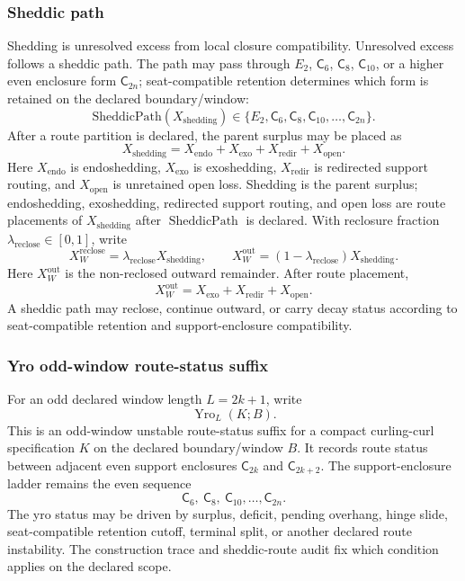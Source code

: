 \subsubsection{Sheddic path}
\label{subsec:sheddic-path}
Shedding is unresolved excess from local closure compatibility. Unresolved excess follows a sheddic path. The path may pass through \(E_2\), \(\mathsf C_6\), \(\mathsf C_8\), \(\mathsf C_{10}\), or a higher even enclosure form \(\mathsf C_{2n}\); seat-compatible retention determines which form is retained on the declared boundary/window:
\begin{equation}
\mathrm{SheddicPath}(X_{\mathrm{shedding}})
\in
\{E_2,\mathsf C_6,\mathsf C_8,\mathsf C_{10},\ldots,\mathsf C_{2n}\}.
\label{eq:sheddic-path}
\end{equation}
After a route partition is declared, the parent surplus may be placed as
\begin{equation}
X_{\mathrm{shedding}}
=
X_{\mathrm{endo}}+X_{\mathrm{exo}}+X_{\mathrm{redir}}+X_{\mathrm{open}}.
\label{eq:shedding-route-partition}
\end{equation}
Here \(X_{\mathrm{endo}}\) is endoshedding, \(X_{\mathrm{exo}}\) is exoshedding, \(X_{\mathrm{redir}}\) is redirected support routing, and \(X_{\mathrm{open}}\) is unretained open loss. Shedding is the parent surplus; endoshedding, exoshedding, redirected support routing, and open loss are route placements of \(X_{\mathrm{shedding}}\) after \(\operatorname{SheddicPath}\) is declared.
With reclosure fraction \(\lambda_{\mathrm{reclose}}\in[0,1]\), write
\[
X_W^{\mathrm{reclose}}=\lambda_{\mathrm{reclose}} X_{\mathrm{shedding}},
\qquad
X_W^{\mathrm{out}}=(1-\lambda_{\mathrm{reclose}})X_{\mathrm{shedding}}.
\]
Here \(X_W^{\mathrm{out}}\) is the non-reclosed outward remainder. After route placement,
\[
X_W^{\mathrm{out}}=X_{\mathrm{exo}}+X_{\mathrm{redir}}+X_{\mathrm{open}}.
\]
A sheddic path may reclose, continue outward, or carry decay status according to seat-compatible retention and support-enclosure compatibility.


\subsubsection{Yro odd-window route-status suffix}
\label{subsec:yro-odd-window-route-status}
For an odd declared window length \(L=2k+1\), write
\[
\operatorname{Yro}_{L}(K;B).
\]
This is an odd-window unstable route-status suffix for a compact curling-curl specification \(K\) on the declared boundary/window \(B\). It records route status between adjacent even support enclosures \(\mathsf C_{2k}\) and \(\mathsf C_{2k+2}\). The support-enclosure ladder remains the even sequence
\[
\mathsf C_6,\ \mathsf C_8,\ \mathsf C_{10},\ldots,\mathsf C_{2n}.
\]
The yro status may be driven by surplus, deficit, pending overhang, hinge slide, seat-compatible retention cutoff, terminal split, or another declared route instability. The construction trace and sheddic-route audit fix which condition applies on the declared scope.

